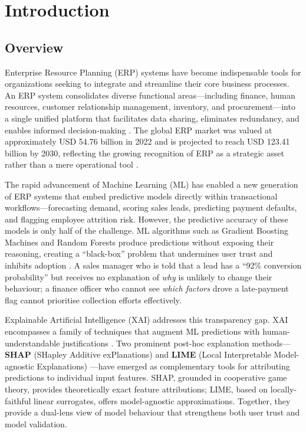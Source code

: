 \documentclass[12pt,a4paper]{report}
\begin{document}
\newpage
{}
\setcounter{page}{1}

%
%
\chapter{Introduction}
\label{ch:introduction}

\section{Overview}
\label{sec:overview}

Enterprise Resource Planning (ERP) systems have become indispensable tools for organizations seeking to integrate and streamline their core business processes. An ERP system consolidates diverse functional areas---including finance, human resources, customer relationship management, inventory, and procurement---into a single unified platform that facilitates data sharing, eliminates redundancy, and enables informed decision-making \citep{monk2013concepts}. The global ERP market was valued at approximately USD 54.76 billion in 2022 and is projected to reach USD 123.41 billion by 2030, reflecting the growing recognition of ERP as a strategic asset rather than a mere operational tool \citep{grandviewresearch2023}.

The rapid advancement of Machine Learning (ML) has enabled a new generation of ERP systems that embed predictive models directly within transactional workflows---forecasting demand, scoring sales leads, predicting payment defaults, and flagging employee attrition risk. However, the predictive accuracy of these models is only half of the challenge. ML algorithms such as Gradient Boosting Machines and Random Forests produce predictions without exposing their reasoning, creating a ``black-box'' problem that undermines user trust and inhibits adoption \citep{lipton2018mythos}. A sales manager who is told that a lead has a ``92\% conversion probability'' but receives no explanation of \textit{why} is unlikely to change their behaviour; a finance officer who cannot see \textit{which factors} drove a late-payment flag cannot prioritise collection efforts effectively.

Explainable Artificial Intelligence (XAI) addresses this transparency gap. XAI encompasses a family of techniques that augment ML predictions with human-understandable justifications \citep{arrieta2020explainable}. Two prominent post-hoc explanation methods---\textbf{SHAP} (SHapley Additive exPlanations) \citep{lundberg2017unified} and \textbf{LIME} (Local Interpretable Model-agnostic Explanations) \citep{ribeiro2016why}---have emerged as complementary tools for attributing predictions to individual input features. SHAP, grounded in cooperative game theory, provides theoretically exact feature attributions; LIME, based on locally-faithful linear surrogates, offers model-agnostic approximations. Together, they provide a dual-lens view of model behaviour that strengthens both user trust and model validation.
\end{document}
